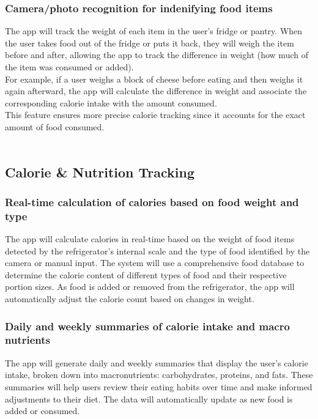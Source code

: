 \documentclass[conference]{IEEEtran}
\begin{document}
\subsubsection{Camera/photo recognition for indenifying food items}
The app will track the weight of each item in the user’s fridge or pantry. When the user takes food out of the fridge or puts it back, they will weigh the item before and after, allowing the app to track the difference in weight (how much of the item was consumed or added).\\
For example, if a user weighs a block of cheese before eating and then weighs it again afterward, the app will calculate the difference in weight and associate the corresponding calorie intake with the amount consumed.\\
This feature ensures more precise calorie tracking since it accounts for the exact amount of food consumed.\\\\

\subsection{Calorie \& Nutrition Tracking}
\subsubsection{Real-time calculation of calories based on food weight and type}
The app will calculate calories in real-time based on the weight of food items detected by the refrigerator’s internal scale and the type of food identified by the camera or manual input. The system will use a comprehensive food database to determine the calorie content of different types of food and their respective portion sizes. As food is added or removed from the refrigerator, the app will automatically adjust the calorie count based on changes in weight.\\
\subsubsection{Daily and weekly summaries of calorie intake and macro nutrients}
The app will generate daily and weekly summaries that display the user’s calorie intake, broken down into macronutrients: carbohydrates, proteins, and fats. These summaries will help users review their eating habits over time and make informed adjustments to their diet. The data will automatically update as new food is added or consumed.\\
\end{document}
